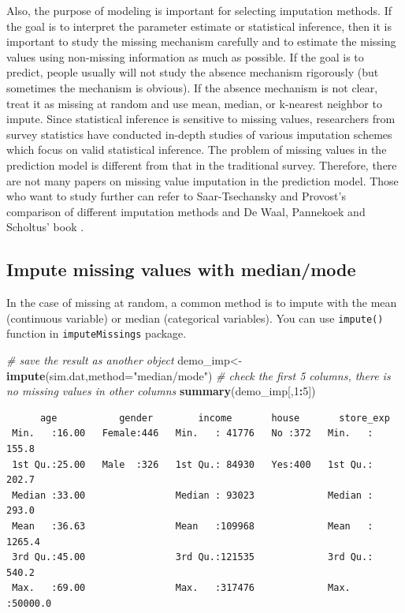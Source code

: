 \documentclass[12pt,]{krantz}
\makeatletter
\newenvironment{Shaded}{\begin{snugshade}}{\end{snugshade}}
\newcommand{\KeywordTok}[1]{\textcolor[rgb]{0.27,0.27,0.27}{\textbf{#1}}}
\newcommand{\DataTypeTok}[1]{\textcolor[rgb]{0.27,0.27,0.27}{#1}}
\newcommand{\DecValTok}[1]{\textcolor[rgb]{0.06,0.06,0.06}{#1}}
\newcommand{\StringTok}[1]{\textcolor[rgb]{0.5,0.5,0.5}{#1}}
\newcommand{\CommentTok}[1]{\textcolor[rgb]{0.37,0.37,0.37}{\textit{#1}}}
\newcommand{\OperatorTok}[1]{\textcolor[rgb]{0.43,0.43,0.43}{\textbf{#1}}}
\newcommand{\NormalTok}[1]{#1}
\newenvironment{kframe}{%
\medskip{}
\setlength{\fboxsep}{.8em}
 \def\at@end@of@kframe{}%
 \ifinner\ifhmode%
  \def\at@end@of@kframe{\end{minipage}}%
  \begin{minipage}{\columnwidth}%
 \fi\fi%
 \def\FrameCommand##1{\hskip\@totalleftmargin \hskip-\fboxsep
 \colorbox{shadecolor}{##1}\hskip-\fboxsep
     \hskip-\linewidth \hskip-\@totalleftmargin \hskip\columnwidth}%
 \MakeFramed {\advance\hsize-\width
   \@totalleftmargin\z@ \linewidth\hsize
   \@setminipage}}%
 {\par\unskip\endMakeFramed%
 \at@end@of@kframe}
\renewenvironment{Shaded}{\begin{kframe}}{\end{kframe}}
\theoremstyle{definition}
\theoremstyle{definition}
\theoremstyle{definition}
\theoremstyle{remark}
\makeatother
\begin{document}
Also, the purpose of modeling is important for selecting imputation
methods. If the goal is to interpret the parameter estimate or
statistical inference, then it is important to study the missing
mechanism carefully and to estimate the missing values using non-missing
information as much as possible. If the goal is to predict, people
usually will not study the absence mechanism rigorously (but sometimes
the mechanism is obvious). If the absence mechanism is not clear, treat
it as missing at random and use mean, median, or k-nearest neighbor to
impute. Since statistical inference is sensitive to missing values,
researchers from survey statistics have conducted in-depth studies of
various imputation schemes which focus on valid statistical inference.
The problem of missing values in the prediction model is different from
that in the traditional survey. Therefore, there are not many papers on
missing value imputation in the prediction model. Those who want to
study further can refer to Saar-Tsechansky and Provost's comparison of
different imputation methods \citep{missing1} and De Waal, Pannekoek and
Scholtus' book \citep{Ton2011}.

\subsection{Impute missing values with
median/mode}\label{impute-missing-values-with-medianmode}

In the case of missing at random, a common method is to impute with the
mean (continuous variable) or median (categorical variables). You can
use \texttt{impute()} function in \texttt{imputeMissings} package.

\begin{Shaded}
\begin{Highlighting}[]
\CommentTok{# save the result as another object}
\NormalTok{demo_imp<-}\KeywordTok{impute}\NormalTok{(sim.dat,}\DataTypeTok{method=}\StringTok{"median/mode"}\NormalTok{)}
\CommentTok{# check the first 5 columns, there is no missing values in other columns}
\KeywordTok{summary}\NormalTok{(demo_imp[,}\DecValTok{1}\OperatorTok{:}\DecValTok{5}\NormalTok{])}
\end{Highlighting}
\end{Shaded}

\begin{verbatim}
      age           gender        income       house       store_exp      
 Min.   :16.00   Female:446   Min.   : 41776   No :372   Min.   :  155.8  
 1st Qu.:25.00   Male  :326   1st Qu.: 84930   Yes:400   1st Qu.:  202.7  
 Median :33.00                Median : 93023             Median :  293.0  
 Mean   :36.63                Mean   :109968             Mean   : 1265.4  
 3rd Qu.:45.00                3rd Qu.:121535             3rd Qu.:  540.2  
 Max.   :69.00                Max.   :317476             Max.   :50000.0 
\end{verbatim}
\end{document}
